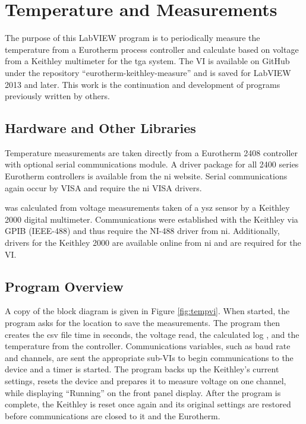 \section{Temperature and  Measurements}
    \label{app:tgavi}
    The purpose of this LabVIEW program is to periodically measure the temperature from a Eurotherm process controller and calculate  based on voltage from a Keithley multimeter for the \gls{tga} system.
    The VI is available on GitHub under the repository ``eurotherm-keithley-measure'' and is saved for LabVIEW 2013 and later.
    This work is the continuation and development of programs previously written by others.

    \subsection{Hardware and Other Libraries}
    Temperature measurements are taken directly from a Eurotherm 2408 controller with optional serial communications module.
    A driver package for all 2400 series Eurotherm controllers is available from the \gls{ni} website.
    Serial communications again occur by VISA and require the \gls{ni} VISA drivers.

     was calculated from voltage measurements taken of a \gls{ysz} sensor by a Keithley 2000 digital multimeter.
    Communications were established with the Keithley via GPIB (IEEE-488) and thus require the NI-488 driver from \gls{ni}.
    Additionally, drivers for the Keithley 2000 are available online from \gls{ni} and are required for the VI.

    \subsection{Program Overview}
    A copy of the block diagram is given in Figure \ref{fig:tempvi}.
    When started, the program asks for the location to save the measurements.
    The program then creates the \gls{csv} file time in seconds, the voltage read, the calculated log , and the temperature from the controller.
    Communications variables, such as baud rate and channels, are sent the appropriate sub-VIs to begin communications to the device and a timer is started.
    The program backs up the Keithley's current settings, resets the device and prepares it to measure voltage on one channel, while displaying ``Running'' on the front panel display.
    After the program is complete, the Keithley is reset once again and its original settings are restored before communications are closed to it and the Eurotherm.

